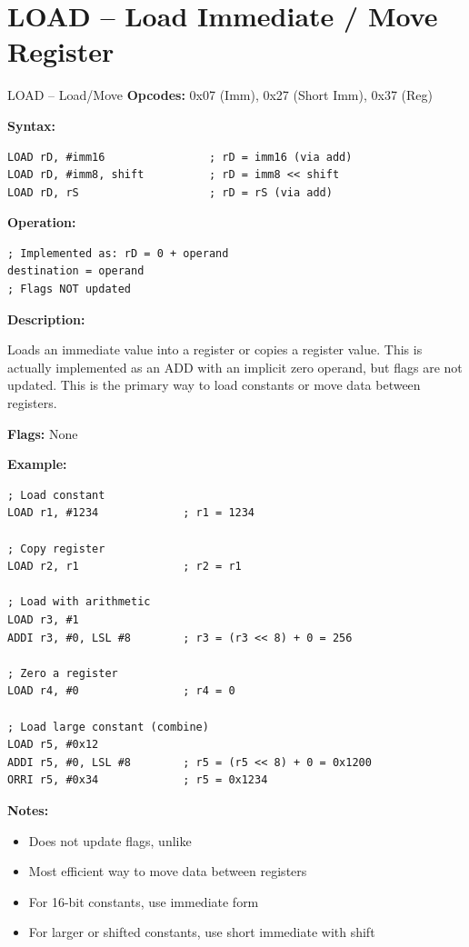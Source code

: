 \section{LOAD -- Load Immediate / Move Register}

\begin{instructionbox}{LOAD -- Load/Move}
	\textbf{Opcodes:} 0x07 (Imm), 0x27 (Short Imm), 0x37 (Reg)

	\textbf{Syntax:}
	\begin{lstlisting}
LOAD rD, #imm16                ; rD = imm16 (via add)
LOAD rD, #imm8, shift          ; rD = imm8 << shift
LOAD rD, rS                    ; rD = rS (via add)
\end{lstlisting}

	\textbf{Operation:}
	\begin{verbatim}
; Implemented as: rD = 0 + operand
destination = operand
; Flags NOT updated
\end{verbatim}

	\textbf{Description:}

	Loads an immediate value into a register or copies a register value. This is actually implemented as an ADD with an
	implicit zero operand, but flags are not updated. This is the primary way to load constants or move data between
	registers.

	\textbf{Flags:} None

	\textbf{Example:}
	\begin{lstlisting}
; Load constant
LOAD r1, #1234             ; r1 = 1234

; Copy register
LOAD r2, r1                ; r2 = r1

; Load with arithmetic
LOAD r3, #1
ADDI r3, #0, LSL #8        ; r3 = (r3 << 8) + 0 = 256

; Zero a register
LOAD r4, #0                ; r4 = 0

; Load large constant (combine)
LOAD r5, #0x12
ADDI r5, #0, LSL #8        ; r5 = (r5 << 8) + 0 = 0x1200
ORRI r5, #0x34             ; r5 = 0x1234
\end{lstlisting}

	\textbf{Notes:}
	\begin{itemize}
		\item Does not update flags, unlike 
		\item Most efficient way to move data between registers
		\item For 16-bit constants, use immediate form
		\item For larger or shifted constants, use short immediate with shift
	\end{itemize}
\end{instructionbox}

